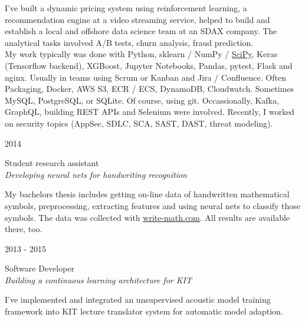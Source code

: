 \documentclass[a4paper,10pt]{article} %
\begin{document}
{\begin{minipage}[t]{0.5\textwidth}
\normalsize{I've built a dynamic pricing system using reinforcement learning, a recommendation engine at a video streaming service, helped to build and establish a local and offshore data science team at an SDAX company. The analytical tasks involved A/B tests, churn analysis, fraud prediction.\\
My work typically was done with Python, sklearn / NumPy / \href{https://arxiv.org/pdf/1907.10121.pdf}{SciPy}, Keras (Tensorflow backend), XGBoost,
Jupyter Notebooks, Pandas, pytest, Flask and nginx. Usually in teams using
Scrum or Kanban and Jira / Confluence. Often Packaging, Docker, AWS S3, ECR /
ECS, DynamoDB, Cloudwatch. Sometimes MySQL, PostgreSQL, or SQLite. Of course, using git.
Occassionally, Kafka, GraphQL, building REST APIs and Selenium were involved. Recently, I worked on security topics (AppSec, SDLC, SCA, SAST, DAST, threat modeling).}\\


{\raggedleft\textsc{2014}\par}

{\raggedright\large Student research assistant\\
\textit{Developing neural nets for handwriting recognition}\\[5pt]}

\normalsize{My bachelors thesis includes getting on-line data of handwritten
mathematical symbols, preprocessing, extracting features and using neural nets
to classify those symbols. The data was collected with \href{http://write-math.com}{write-math.com}. All results are available there, too.}\\


{\raggedleft\textsc{2013 - 2015}\par}

{\raggedright\large Software Developer\\
\textit{Building a continuous learning architecture for KIT}\\[5pt]}

\normalsize{I've implemented and integrated an unsupervised acoustic model training framework into KIT lecture translator system for automatic model adaption.}\\


\end{minipage}}
\end{document}
